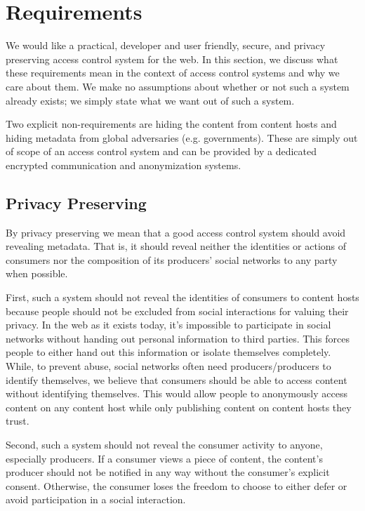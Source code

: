 \documentclass[pdftex,12pt,a4papaer,twoside,notitlepage]{report}
\begin{document}
\section{Requirements}

We would like a practical, developer and user friendly, secure, and privacy
preserving access control system for the web. In this section, we discuss what
these requirements mean in the context of access control systems and why we care
about them. We make no assumptions about whether or not such a system already
exists; we simply state what we want out of such a system.

Two explicit non-requirements are hiding the content from content hosts and
hiding metadata from global adversaries (e.g. governments). These are simply out
of scope of an access control system and can be provided by a dedicated
encrypted communication and anonymization systems.

\subsection{Privacy Preserving}

By privacy preserving we mean that a good access control system should avoid
revealing metadata. That is, it should reveal neither the identities or actions
of consumers nor the composition of its producers' social networks to any party
when possible.

First, such a system should not reveal the identities of consumers to content
hosts because people should not be excluded from social interactions for valuing
their privacy. In the web as it exists today, it's impossible to participate in
social networks without handing out personal information to third parties. This
forces people to either hand out this information or isolate themselves
completely. While, to prevent abuse, social networks often need
producers/producers to identify themselves, we believe that consumers should
be able to access content without identifying themselves. This would allow
people to anonymously access content on any content host while only publishing
content on content hosts they trust.

Second, such a system should not reveal the consumer activity to anyone,
especially producers. If a consumer views a piece of content, the content's
producer should not be notified in any way without the consumer's explicit
consent. Otherwise, the consumer loses the freedom to choose to either defer or
avoid participation in a social interaction.
\end{document}
